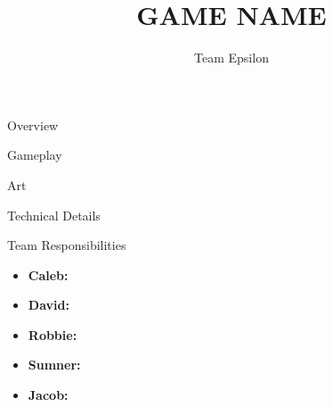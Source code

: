 \documentclass{teamepsilon}
\title{GAME NAME}
\author{Team Epsilon}
\institute{Colorado School of Mines}
\begin{document}
\begin{frame}{Overview}

\end{frame}

\begin{frame}{Gameplay}

\end{frame}

\begin{frame}{Art}

\end{frame}

\begin{frame}{Technical Details}

\end{frame}

\begin{frame}{Team Responsibilities}
    \begin{itemize}
        \item \textbf{Caleb:}
        \item \textbf{David:}
        \item \textbf{Robbie:}
        \item \textbf{Sumner:}
        \item \textbf{Jacob:}
    \end{itemize}
\end{frame}
\end{document}
